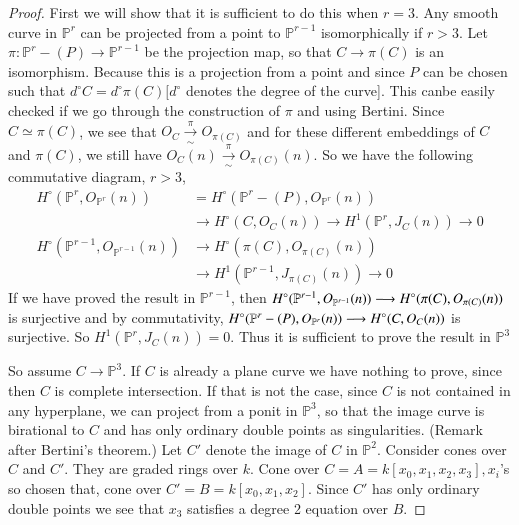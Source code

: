 \begin{proof}
First we will show that it is sufficient to do this when $r=3$. Any
smooth curve in $\mathbb{P}^r$ can be projected from a point to
$\mathbb{P}^{r-1}$ isomorphically if $r>3$. Let $\pi :\mathbb{P}^r-(P)
\longrightarrow\mathbb{P}^{r-1}$ be the projection map, so that $C
\longrightarrow \pi(C)$ is an isomorphism. Because this is a
projection from a point and since $P$ can be chosen such that $d^\circ
C= d^\circ\pi(C)[d^\circ$ denotes the degree of the curve]. This
can\pageoriginale be easily checked if we go through the construction
of $\pi$ and using Bertini. Since $C\simeq\pi(C)$, we see that $O_C
\xrightarrow[\sim]{\pi}O_{\pi(C)}$ and for these different embeddings
of $C$ and $\pi(C)$, we still have $O_C(n)\xrightarrow[\sim]{\pi}
O_{\pi(C)}(n)$. So we have the following commutative diagram, $r>3$, 
\begin{align*}
H^\circ(\mathbb{P}^r,O_{\mathbb{P}^r}(n))&=H^\circ(\mathbb{P}^r-(P),O_{\mathbb{P}^r}
(n))\\
&\longrightarrow H^\circ(C,O_C(n))\longrightarrow
H^1(\mathbb{P}^r,J_C(n))\longrightarrow 0\\
H^\circ(\mathbb{P}^{r-1},O_{\mathbb{P}^{r-1}}(n))&\longrightarrow
H^\circ (\pi(C),O_{\pi(C)}(n))\\
&\longrightarrow H^1 (\mathbb{P}^{r-1},
J_{\pi(C)}(n))\longrightarrow 0
\end{align*}
If we have proved the result in $\mathbb{P}^{r-1}$, then $H^\circ
(\mathbb{P}^{r-1}, O_{\mathbb{P}^{r-1}}(n))\longrightarrow\break
H^\circ(\pi(C),O_{\pi(C)}(n))$ is surjective and by commutativity,
$H^\circ (\mathbb{P}^r-(P),\break O_{\mathbb{P}^r}(n)) \longrightarrow
H^\circ (C,O_C(n))$ is surjective. So $H^1(\mathbb{P}^r, J_C
(n))=0$. Thus it is sufficient to prove the result in $\mathbb{P}^3$ 

So assume $C\longrightarrow\mathbb{P}^3$. If $C$ is already a plane
curve we have nothing to prove, since then $C$ is complete
intersection. If that is not the case, since $C$ is not contained in
any hyperplane, we can project from a ponit in $\mathbb{P}^3$, so that
the image curve is
birational to $C$ and has only ordinary double points as
singularities. (Remark after Bertini's theorem.) Let $C'$ denote the
image of $C$ in $\mathbb{P}^2$. Consider cones over $C$ and $C'$. They
are graded rings over $k$. Cone over $C=A=k[x_0,x_1,x_2,x_3],x_i$'s so
chosen that, cone over $C'=B=k[x_0,x_1,x_2]$. Since $C'$ has only
ordinary double points we see that $x_3$ satisfies a degree 2 equation
over $B$.


\end{proof}
